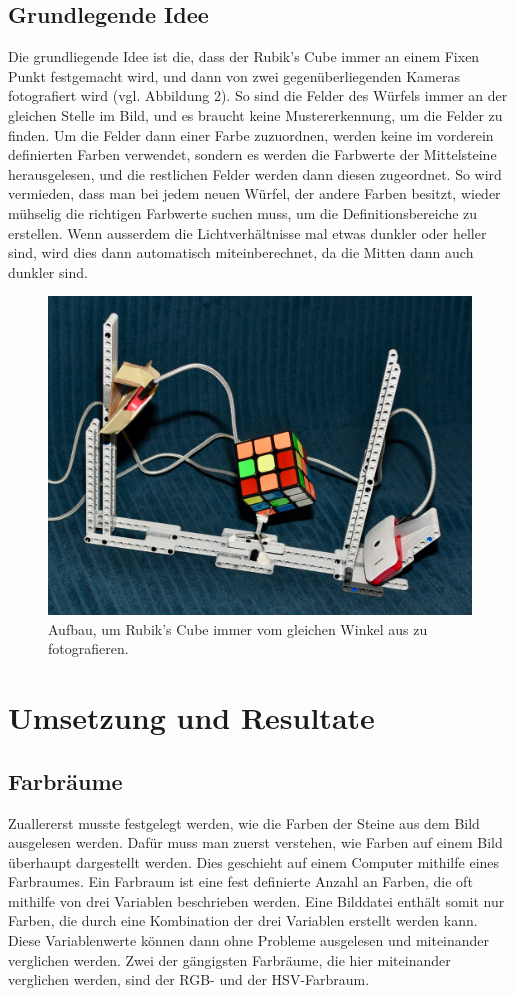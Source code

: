 \documentclass[a4paper, 12pt]{article}
\begin{document}
\subsection{Grundlegende Idee}
Die grundliegende Idee ist die, dass der Rubik's Cube immer an einem Fixen Punkt festgemacht wird, und dann von zwei gegenüberliegenden Kameras fotografiert wird (vgl. Abbildung 2). So sind die Felder des Würfels immer an der gleichen Stelle im Bild, und es braucht keine Mustererkennung, um die Felder zu finden. Um die Felder dann einer Farbe zuzuordnen, werden keine im vorderein definierten Farben verwendet, sondern es werden die Farbwerte der Mittelsteine herausgelesen, und die restlichen Felder werden dann diesen zugeordnet. So wird vermieden, dass man bei jedem neuen Würfel, der andere Farben besitzt, wieder mühselig die richtigen Farbwerte suchen muss, um die Definitionsbereiche zu erstellen. Wenn ausserdem die Lichtverhältnisse  mal etwas dunkler oder heller sind, wird dies dann automatisch miteinberechnet, da die Mitten dann auch dunkler sind. 
\begin{figure}[H]
\includegraphics[scale=0.25]{Aufbau_Bild}
\caption{Aufbau, um Rubik's Cube immer vom gleichen Winkel aus zu fotografieren.}
\end{figure}
\newpage
\section{Umsetzung und Resultate}
\subsection{Farbräume}
Zuallererst musste festgelegt werden, wie die Farben der Steine aus dem Bild ausgelesen werden. Dafür muss man zuerst verstehen, wie Farben auf einem Bild überhaupt dargestellt werden. Dies geschieht auf einem Computer mithilfe eines Farbraumes. Ein Farbraum ist eine fest definierte Anzahl an Farben, die oft mithilfe von drei Variablen beschrieben werden. Eine Bilddatei enthält somit nur Farben, die durch eine Kombination der drei Variablen erstellt werden kann. \cite{Farbraum} Diese Variablenwerte können dann ohne Probleme ausgelesen und miteinander verglichen werden. Zwei der gängigsten Farbräume, die hier miteinander verglichen werden, sind der RGB- und der HSV-Farbraum. 
\end{document}
